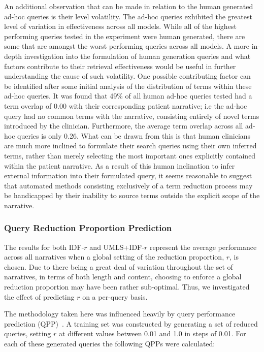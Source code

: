 \documentclass[a4paper]{report}
\begin{document}
An additional observation that can be made in relation to the human generated ad-hoc queries is their level volatility. The ad-hoc queries exhibited the greatest level of variation in effectiveness across all models. While all of the highest performing queries tested in the experiment were human generated, there are some that are amongst the worst performing queries across all models. A more in-depth investigation into the formulation of human generation queries and what factors contribute to their retrieval effectiveness would be useful in further understanding the cause of such volatility. One possible contributing factor can be identified after some initial analysis of the distribution of terms within these ad-hoc queries. It was found that 49\% of all human ad-hoc queries tested had a term overlap of 0.00 with their corresponding patient narrative; i.e the ad-hoc query had no common terms with the narrative, consisting entirely of novel terms introduced by the clinician. Furthermore, the average term overlap across all ad-hoc queries is only 0.26. What can be drawn from this is that human clinicians are much more inclined to formulate their search queries using their own inferred terms, rather than merely selecting the most important ones explicitly contained within the patient narrative. As a result of this human inclination to infer external information into their formulated query, it seems reasonable to suggest that automated methods consisting exclusively of a term reduction process may be handicapped by their inability to source terms outside the explicit scope of the narrative. 

\subsubsection{Query Reduction Proportion Prediction}

The results for both IDF-$r$ and UMLS+IDF-$r$ represent the average performance across all narratives when a global setting of the reduction proportion, $r$, is chosen. Due to there being a great deal of variation throughout the set of narratives, in terms of both length and content, choosing to enforce a global reduction proportion may have been rather sub-optimal. Thus, we investigated the effect of predicting $r$ on a per-query basis. 

The methodology taken here was influenced heavily by query performance prediction (QPP)~\citep{Kumaran2009Reducing-Long-Q}. A training set was constructed by generating a set of reduced queries, setting $r$ at different values between 0.01 and 1.0 in steps of 0.01. For each of these generated queries the following QPPs were calculated:
\end{document}
